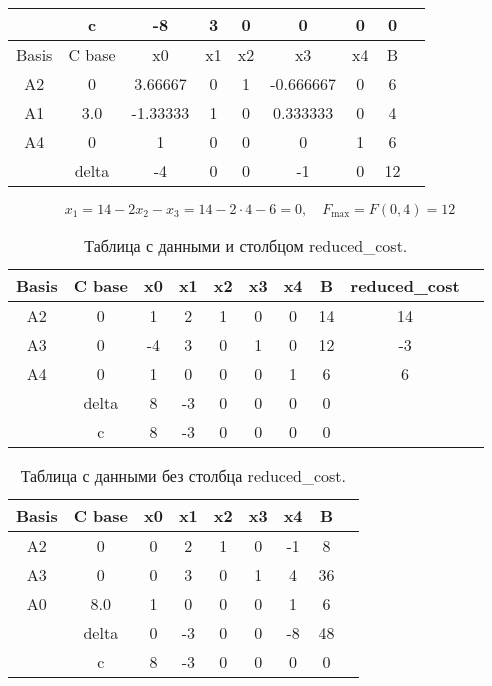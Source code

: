 \documentclass[17pt]{extarticle}
\begin{document}
\begin{table}[H]
    \centering
    \begin{tabular}{c|c|ccccccc}
        \toprule
              & c      & -8       & 3  & 0  & 0         & 0  & 0  \\
        \midrule
        Basis & C base & x0       & x1 & x2 & x3        & x4 & B  \\
        \midrule
        A2    & 0      & 3.66667  & 0  & 1  & -0.666667 & 0  & 6  \\
        A1    & 3.0    & -1.33333 & 1  & 0  & 0.333333  & 0  & 4  \\
        A4    & 0      & 1        & 0  & 0  & 0         & 1  & 6  \\
        \midrule
              & delta  & -4       & 0  & 0  & -1        & 0  & 12 \\
        \bottomrule
    \end{tabular}
\end{table}

\[ x_1 = 14 - 2x_2 - x_3 = 14 - 2 \cdot 4 - 6 = 0, \quad F_{\text{max}} = F(0, 4) = 12 \]

\begin{table}[H]
    \centering
    \begin{tabular}{c|c|ccccccc|c}
        \toprule
        Basis & C base & x0 & x1 & x2 & x3 & x4 & B  & reduced\_cost \\
        \midrule
        A2    & 0      & 1  & 2  & 1  & 0  & 0  & 14 & 14            \\
        A3    & 0      & -4 & 3  & 0  & 1  & 0  & 12 & -3            \\
        A4    & 0      & 1  & 0  & 0  & 0  & 1  & 6  & 6             \\
        \midrule
              & delta  & 8  & -3 & 0  & 0  & 0  & 0  &               \\
              & c      & 8  & -3 & 0  & 0  & 0  & 0  &               \\
        \bottomrule
    \end{tabular}
    \caption{Таблица с данными и столбцом reduced\_cost.}
\end{table}

\begin{table}[H]
    \centering
    \begin{tabular}{c|c|ccccccc}
        \toprule
        Basis & C base & x0 & x1 & x2 & x3 & x4 & B  \\
        \midrule
        A2    & 0      & 0  & 2  & 1  & 0  & -1 & 8  \\
        A3    & 0      & 0  & 3  & 0  & 1  & 4  & 36 \\
        A0    & 8.0    & 1  & 0  & 0  & 0  & 1  & 6  \\
        \midrule
              & delta  & 0  & -3 & 0  & 0  & -8 & 48 \\
              & c      & 8  & -3 & 0  & 0  & 0  & 0  \\
        \bottomrule
    \end{tabular}
    \caption{Таблица с данными без столбца reduced\_cost.}
\end{table}
\end{document}

